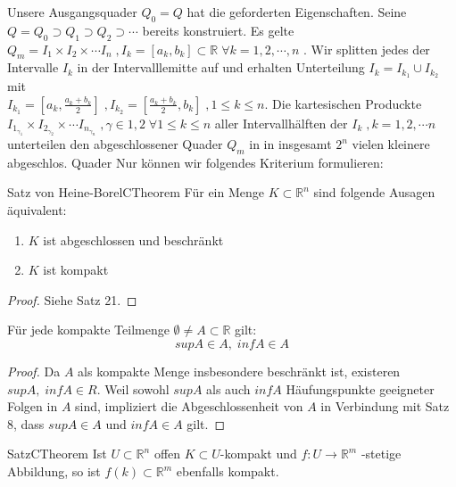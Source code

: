 %
%
Unsere Ausgangsquader $ Q_0 = Q $ hat die geforderten Eigenschaften. Seine 
$ Q = Q_0 \supset Q_1 \supset Q_2 \supset \cdots$ bereits konstruiert. Es gelte $ Q_{m} = I_1 
\times I_2 \times \cdots I_{n} \; , I_{k} = \left[ a_{k}, b_{k} \right]  \subset \mathbb{R} \; 
\forall k = 1,2,\cdots, n$ . Wir splitten jedes der Intervalle $ I_{k} $ in der Intervalllemitte 
auf und erhalten Unterteilung $ I_{k} = I_{k_{1}} \cup I_{k_{2}} $ mit \\
$ I_{k_{1}} = \left[ a_{k}, \frac{a_{k}+ b_{k}}{2} \right] \; , I_{k_{2}} 
= \left[ \frac{a_{k}+ b_{k}}{2}, b_{k} \right] \; , 1 \leq k \leq n $. Die kartesischen Produckte
$ I_{1_{ \gamma_{1}}} \times I_{2_{ \gamma_{2}}} \times \cdots  I_{n_{ \gamma_{n}}} \; ,
\gamma \in {1,2} \; \forall 1 \leq k \leq n $ aller Intervallhälften der $ I_{k} \; , k = 1,2, \cdots n $ unterteilen den  abgeschlossener Quader $ Q_{m} $  in 
in insgesamt $ 2^{n} $  vielen kleinere abgeschlos. Quader  
Nur können wir folgendes Kriterium formulieren:
\begin{ibox}[25]{Satz von Heine-Borel}{CTheorem}
    Für ein Menge $ K \subset  \mathbb{R}^n  $ sind folgende Ausagen äquivalent:
	\begin{enumerate}[label=\alph*)]
		\item $ K $ ist abgeschlossen und beschränkt
		\item $ K $ ist kompakt
	\end{enumerate}
\end{ibox}

\begin{proof}
	Siehe Satz 21.
\end{proof}

Für jede kompakte Teilmenge $ \emptyset \neq A \subset \mathbb{R}  $ gilt:
$$ sup A \in A, \; inf A \in A $$
\begin{proof}
	Da $ A $ als kompakte Menge insbesondere beschränkt ist, existeren $ sup A, \; inf A \in R $.
	Weil sowohl $ sup A  $ als auch $ inf A $ Häufungspunkte geeigneter Folgen in $ A $ sind, 
	impliziert die Abgeschlossenheit von $ A $ in Verbindung mit Satz 8, dass $ sup A \in  A
	\text{ und } inf A \in A $ gilt.
\end{proof}

\begin{ibox}[26]{Satz}{CTheorem}
    Ist $ U \subset  \mathbb{R}^n  $ offen $ K \subset  U $-kompakt und $ f:U \to \mathbb{R}^m $
	-stetige Abbildung, so ist $ f(k) \subset \mathbb{R}^m $ ebenfalls kompakt.
\end{ibox}

